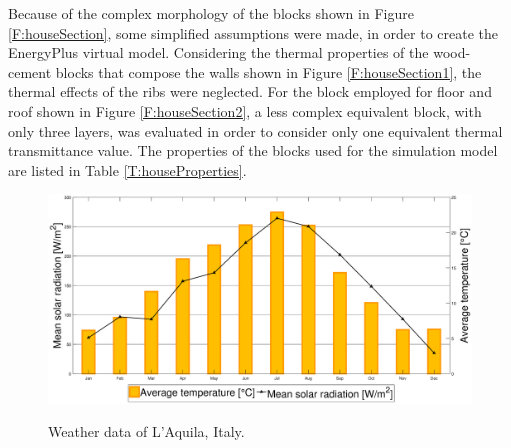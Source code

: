 Because of the complex morphology of the blocks shown in Figure \ref{F:houseSection}, some simplified assumptions were made, in order to create the EnergyPlus virtual model. Considering the thermal properties of the wood-cement blocks that compose the walls shown in Figure \ref{F:houseSection1}, the thermal effects of the ribs were neglected. For the block employed for floor and roof shown in Figure \ref{F:houseSection2}, a less complex equivalent block, with only three layers, was evaluated in order to consider only one equivalent thermal transmittance value. The properties of the blocks used for the simulation model are listed in Table \ref{T:houseProperties}.    
\begin{figure}[t!]
	\begin{center}
		\includegraphics[width=30pc]{figures/dati_climatici_rev01.eps}
		\caption{Weather data of L'Aquila, Italy.}
		\captionsetup{justification=centering}
		\label{F:houseExternalWeather}
	\end{center}
\end{figure}
